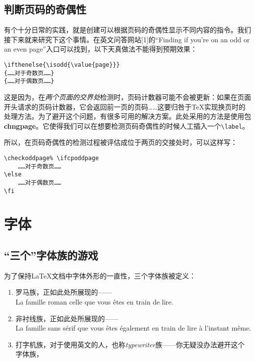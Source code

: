 \subsection{判断页码的奇偶性}

有个十分日常的实践，就是创建可以根据页码的奇偶性显示不同内容的指令。我们接下来就来研究下这个事情。在英文问答网站[1]的“Finding if you're on an odd or an even page”入口可以找到，以下天真做法不能得到预期效果：

\begin{dmd}
\begin{verbatim}
\ifthenelse{\isodd{\value{page}}} 
{……对于奇数页……}
{……对于偶数页……}
\end{verbatim}
\end{dmd}

这是因为，在\emph{两个页面的交界处}检测时，页码计数器可能不会被更新：如果在页面开头请求的页码计数器，它会返回前一页的页码……这要归咎于\TeX 实现换页时的处理方法。为了避开这个问题，有很多可用的解决方案。此处采用的方法是使用包\textbf{chngpage}。它使得我们可以在想要检测页码奇偶性的时候人工插入一个\verb|\label|。

所以，在页码奇偶性的检测过程被评估成位于两页的交接处时，可以这样写：

\begin{dmd}
\begin{verbatim}
\checkoddpage% \ifcpoddpage
    ……对于奇数页……
\else
    ……对于偶数页……
\fi 
\end{verbatim}
\end{dmd}

\section{字体}

\subsection{“三个”字体族的游戏}

为了保持\LaTeX 文档中字体外形的一直性，三个字体族被定义：

\begin{enumerate}
    \item 罗马族，正如此处所展现的——\\La famille roman celle que vous êtes en train de lire.
    \item \textsf{非衬线族，正如此处所展现的——\\La famille sans sérif que vous êtes également en train de lire à l'instant même.}
    \item 打字机族，对于使用英文的人，也称\emph{typewriter}族——你无疑没办法避开这个字体族，
\end{enumerate}


